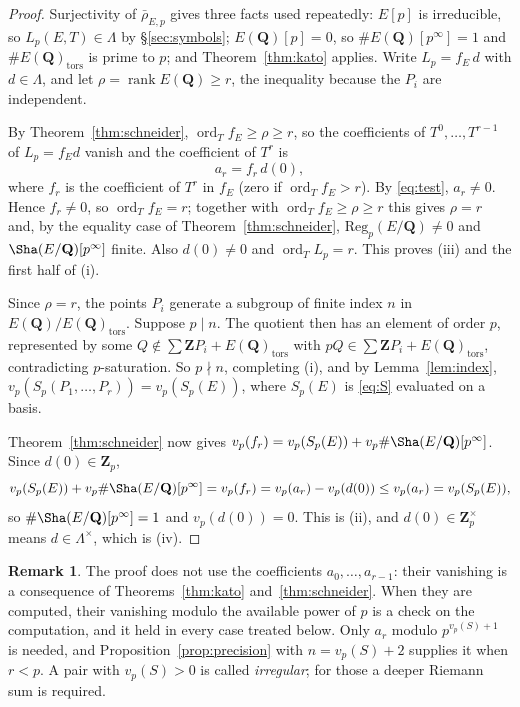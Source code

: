 \documentclass[11pt]{amsart}
\theoremstyle{definition}
\newtheorem{remark}[theorem]{Remark}
\newcommand{\Q}{\mathbf{Q}}
\newcommand{\Z}{\mathbf{Z}}
\newcommand{\Zp}{\mathbf{Z}_p}
\newcommand{\Reg}{\mathrm{Reg}}
\newcommand{\rk}{\operatorname{rank}}
\newcommand{\ord}{\operatorname{ord}}
\newcommand{\rhobar}{\bar\rho_{E,p}}
\newcommand{\tors}{\mathrm{tors}}
\begin{document}
\begin{proof}
Surjectivity of $\rhobar$ gives three facts used repeatedly: $E[p]$ is irreducible, so $L_p(E,T)\in\Lambda$ by \S\ref{sec:symbols}; $E(\Q)[p]=0$, so $\#E(\Q)[p^\infty]=1$ and $\#E(\Q)_\tors$ is prime to $p$; and Theorem~\ref{thm:kato} applies. Write $L_p=f_E\,d$ with $d\in\Lambda$, and let $\rho=\rk E(\Q)\ge r$, the inequality because the $P_i$ are independent.

By Theorem~\ref{thm:schneider}, $\ord_Tf_E\ge\rho\ge r$, so the coefficients of $T^0,\dots,T^{r-1}$ of $L_p=f_Ed$ vanish and the coefficient of $T^r$ is
\[
a_r=f_r\,d(0),
\]
where $f_r$ is the coefficient of $T^r$ in $f_E$ (zero if $\ord_Tf_E>r$). By \eqref{eq:test}, $a_r\neq0$. Hence $f_r\ne0$, so $\ord_Tf_E=r$; together with $\ord_Tf_E\ge\rho\ge r$ this gives $\rho=r$ and, by the equality case of Theorem~\ref{thm:schneider}, $\Reg_p(E/\Q)\ne0$ and $\Sha(E/\Q)[p^\infty]$ finite. Also $d(0)\ne0$ and $\ord_TL_p=r$. This proves (iii) and the first half of (i).

Since $\rho=r$, the points $P_i$ generate a subgroup of finite index $n$ in $E(\Q)/E(\Q)_\tors$. Suppose $p\mid n$. The quotient then has an element of order $p$, represented by some $Q\notin\sum\Z P_i+E(\Q)_\tors$ with $pQ\in\sum\Z P_i+E(\Q)_\tors$, contradicting $p$-saturation. So $p\nmid n$, completing (i), and by Lemma~\ref{lem:index}, $v_p(S_p(P_1,\dots,P_r))=v_p(S_p(E))$, where $S_p(E)$ is \eqref{eq:S} evaluated on a basis.

Theorem~\ref{thm:schneider} now gives $v_p(f_r)=v_p(S_p(E))+v_p\#\Sha(E/\Q)[p^\infty]$. Since $d(0)\in\Zp$,
\[
v_p(S_p(E))+v_p\#\Sha(E/\Q)[p^\infty]=v_p(f_r)=v_p(a_r)-v_p(d(0))\le v_p(a_r)=v_p(S_p(E)),
\]
so $\#\Sha(E/\Q)[p^\infty]=1$ and $v_p(d(0))=0$. This is (ii), and $d(0)\in\Zp^\times$ means $d\in\Lambda^\times$, which is (iv).
\end{proof}

\begin{remark}\label{rem:low}
The proof does not use the coefficients $a_0,\dots,a_{r-1}$: their vanishing is a consequence of Theorems~\ref{thm:kato} and~\ref{thm:schneider}. When they are computed, their vanishing modulo the available power of $p$ is a check on the computation, and it held in every case treated below. Only $a_r$ modulo $p^{v_p(S)+1}$ is needed, and Proposition~\ref{prop:precision} with $n=v_p(S)+2$ supplies it when $r<p$. A pair with $v_p(S)>0$ is called \emph{irregular}; for those a deeper Riemann sum is required.
\end{remark}
\end{document}
